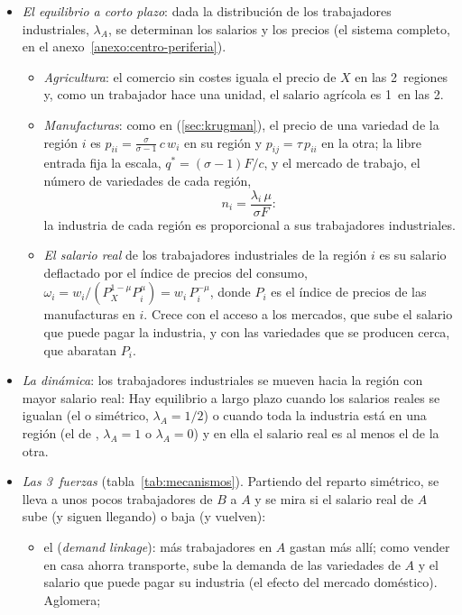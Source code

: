 \documentclass[11pt]{article}
\begin{document}
\begin{itemize}
\item \emph{El equilibrio a corto plazo}: dada la distribución de los trabajadores industriales, $\lambda_A$, se determinan los salarios y los precios (el sistema completo, en el anexo~\ref{anexo:centro-periferia}).
  \begin{itemize}
  \item \emph{Agricultura}: el comercio sin costes iguala el precio de $X$ en las 2~regiones y, como un trabajador hace una unidad, el salario agrícola es 1~en las 2.
  \item \emph{Manufacturas}: como en  (\ref{sec:krugman}), el precio de una variedad de la región $i$ es $p_{ii}=\frac{\sigma}{\sigma-1}\,c\,w_i$ en su región y $p_{ij}=\tau\,p_{ii}$ en la otra; la libre entrada fija la escala, $q^*=(\sigma-1)F/c$, y el mercado de trabajo, el número de variedades de cada región,
  $$n_i=\frac{\lambda_i\,\mu}{\sigma F}:$$
  la industria de cada región es proporcional a sus trabajadores industriales.
  \item \emph{El salario real} de los trabajadores industriales de la región $i$ es su salario deflactado por el índice de precios del consumo, $\omega_i=w_i/(P_X^{1-\mu}P_i^{\mu})=w_i\,P_i^{-\mu}$, donde $P_i$ es el índice de precios de las manufacturas en $i$. Crece con el acceso a los mercados, que sube el salario que puede pagar la industria, y con las variedades que se producen cerca, que abaratan $P_i$.
  \end{itemize}
\item \emph{La dinámica}: los trabajadores industriales se mueven hacia la región con mayor salario real:
  Hay equilibrio a largo plazo cuando los salarios reales se igualan (el  o simétrico, $\lambda_A=1/2$) o cuando toda la industria está en una región (el de , $\lambda_A=1$ o $\lambda_A=0$) y en ella el salario real es al menos el de la otra.
\item \emph{Las 3~fuerzas} (tabla~\ref{tab:mecanismos}). Partiendo del reparto simétrico, se lleva a unos pocos trabajadores de $B$ a $A$ y se mira si el salario real de $A$ sube (y siguen llegando) o baja (y vuelven):
  \begin{itemize}
  \item el  (\emph{demand linkage}): más trabajadores en $A$ gastan más allí; como vender en casa ahorra transporte, sube la demanda de las variedades de $A$ y el salario que puede pagar su industria (el efecto del mercado doméstico). Aglomera;

\end{itemize}
\end{itemize}
\end{document}
